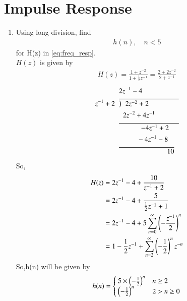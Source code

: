 \documentclass[journal,12pt,twocolumn]{IEEEtran}
\renewcommand\thesection{\arabic{section}}
\begin{document}
    \section{Impulse Response}
    \begin{enumerate}[label=\thesection.\arabic*]
      \item Using long division, 
      find
      \begin{align}
        h(n), \quad n < 5
      \end{align}
      for H(z) in 
      \eqref{eq:freq_resp}.\\
      \solution $H(z)$ is given by
      \begin{align}
        H(z)=\frac{1+z^{-2}}{1+\frac{1}{2}z^{-1}}=\frac{2+2z^{-2}}{2+z^{-1}}
      \end{align}
      \begin{align}
        &2z^{-1}-4\\	
        z^{-1}+2\hspace{2mm}&\overline{\big)\hspace{2mm} 2z^{-2}+2\hspace{15mm}}\\
        & \hspace{2mm} 2z^{-2}+4z^{-1}\\
        &\overline{\hspace{11mm}-4z^{-1}+2\hspace{5mm}}\\
        &\hspace{9mm}-4z^{-1}-8\\ 
        &\overline{\hspace{24mm}10}
      \end{align}
      So,
      \begin{align}
        H(z)&=2z^{-1}-4+\frac{10}{z^{-1}+2}\\
        &=2z^{-1}-4+\frac{5}{\frac{1}{2}z^{-1}+1}\\
        &=2z^{-1}-4+5\sum_{n=0}^\infty \left(-\frac{z^{-1}}{2}\right)^{n}\\
        &=1-\frac{1}{2}z^{-1}+\sum_{n=2}^\infty \left(-\frac{1}{2}\right)^{n}z^{-n}
      \end{align}
      So,h(n) will be given by 
      \begin{align}
        h(n)=\begin{cases}
          \label{eq:h_n_def}
          5\times \left(-\frac{1}{2}\right)^n  & n\geq 2\\
          \left(-\frac{1}{2}\right)^n  &2>n\geq0\\

\end{cases}
\end{align}
\end{enumerate}
\end{document}
